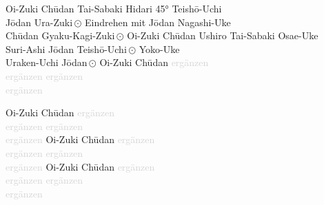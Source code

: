 \begin{tcbitemize}[right=4pt,left=4pt,raster columns=3,raster equal height,colframe=GKD,colback=white,fonttitle=\bfseries]
	\tcbitem[squeezed title*={Kumite Ura 7}]
	Oi-Zuki Ch\={u}dan
	Tai-Sabaki Hidari 45° Teish\={o}-Uchi\\
	J\={o}dan Ura-Zuki\,\(\odot\)
	Eindrehen mit J\={o}dan Nagashi-Uke\\
	Ch\={u}dan Gyaku-Kagi-Zuki\,\(\odot\)
	\tcbitem[squeezed title*={Kumite Ura 8}]
	Oi-Zuki Ch\={u}dan
	Ushiro Tai-Sabaki Osae-Uke\\
	Suri-Ashi J\={o}dan Teish\={o}-Uchi\,\(\odot\)
	Yoko-Uke \\
	Uraken-Uchi J\={o}dan\,\(\odot\)
	\tcbitem[squeezed title*={Kumite Ura 9}]
	Oi-Zuki Ch\={u}dan
	\textcolor{lightgray}{ergänzen}\\
	\textcolor{lightgray}{ergänzen}
	\textcolor{lightgray}{ergänzen}\\
	\textcolor{lightgray}{ergänzen}
\end{tcbitemize}
\null\vfill\null
\zwitepf
\null\vfill\null
\begin{tcbitemize}[right=4pt,left=4pt,raster columns=3,raster equal height,colframe=GKD,colback=white,fonttitle=\bfseries]
	\tcbitem[squeezed title*={Kumite Ura 10}]
	Oi-Zuki Ch\={u}dan
	\textcolor{lightgray}{ergänzen}\\
	\textcolor{lightgray}{ergänzen}
	\textcolor{lightgray}{ergänzen}\\
	\textcolor{lightgray}{ergänzen}
	\tcbitem[squeezed title*={Kumite Ura 11}]
	Oi-Zuki Ch\={u}dan
	\textcolor{lightgray}{ergänzen}\\
	\textcolor{lightgray}{ergänzen}
	\textcolor{lightgray}{ergänzen}\\
	\textcolor{lightgray}{ergänzen}
	\tcbitem[squeezed title*={Kumite Ura 12}]
	Oi-Zuki Ch\={u}dan
	\textcolor{lightgray}{ergänzen}\\
	\textcolor{lightgray}{ergänzen}
	\textcolor{lightgray}{ergänzen}\\
	\textcolor{lightgray}{ergänzen}
\end{tcbitemize}